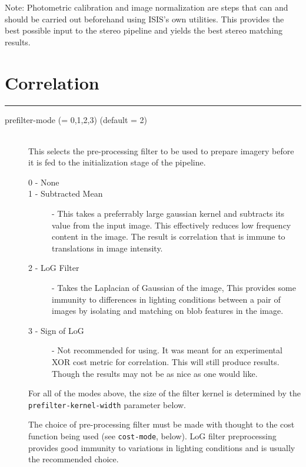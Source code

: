 \begin{description}
  Note: Photometric calibration and image normalization are steps that
  can and should be carried out beforehand using ISIS's own utilities.
  This provides the best possible input to the stereo pipeline and
  yields the best stereo matching results.

\end{description}

\section{Correlation}
\hrule
\bigskip

\begin{description}

\item[prefilter-mode \textnormal{\small{(= 0,1,2,3)}} (default = 2)] \hfill \\
  This selects the pre-processing filter to be used to prepare imagery
  before it is fed to the initialization stage of the pipeline.

  \begin{description}
    \item[0 - None]
    \item[1 - Subtracted Mean] - This takes a preferrably large
      gaussian kernel and subtracts its value from the input
      image. This effectively reduces low frequency content in the
      image. The result is correlation that is immune to translations
      in image intensity.
    \item[2 - LoG Filter] - Takes the Laplacian of Gaussian of the
      image, This provides some immunity to differences in lighting
      conditions between a pair of images by isolating and matching on
      blob features in the image.
    \item[3 - Sign of LoG] - Not recommended for using. It was meant
      for an experimental XOR cost metric for correlation. This will
      still produce results. Though the results may not be as nice as
      one would like.
  \end{description}

  For all of the modes above, the size of the filter kernel is
  determined by the \texttt{prefilter-kernel-width} parameter below.

  The choice of pre-processing filter must be made with thought to the
  cost function being used (see \texttt{cost-mode}, below).  LoG filter
  preprocessing provides good immunity to variations in lighting
  conditions and is usually the recommended choice.


\end{description}
